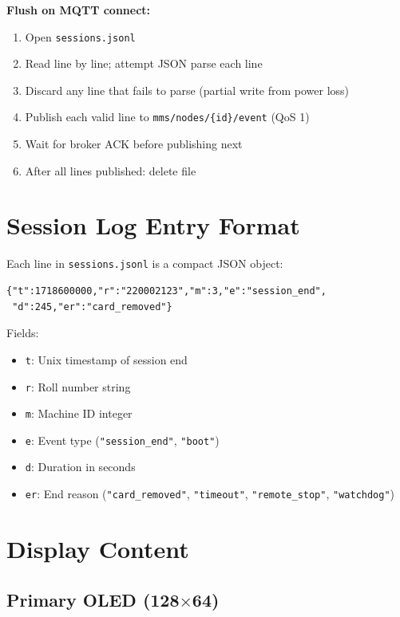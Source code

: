 \textbf{Flush on MQTT connect:}
\begin{enumerate}[leftmargin=1.5em]
    \item Open \texttt{sessions.jsonl}
    \item Read line by line; attempt JSON parse each line
    \item Discard any line that fails to parse (partial write from power loss)
    \item Publish each valid line to \texttt{mms/nodes/\{id\}/event} (QoS 1)
    \item Wait for broker ACK before publishing next
    \item After all lines published: delete file
\end{enumerate}

\section{Session Log Entry Format}

Each line in \texttt{sessions.jsonl} is a compact JSON object:

\begin{lstlisting}[style=jsonlstyle,caption={Session log entry format}]
{"t":1718600000,"r":"220002123","m":3,"e":"session_end",
 "d":245,"er":"card_removed"}
\end{lstlisting}

Fields:
\begin{itemize}[leftmargin=1.5em,noitemsep]
    \item \texttt{t}: Unix timestamp of session end
    \item \texttt{r}: Roll number string
    \item \texttt{m}: Machine ID integer
    \item \texttt{e}: Event type (\texttt{"session\_end"}, \texttt{"boot"})
    \item \texttt{d}: Duration in seconds
    \item \texttt{er}: End reason (\texttt{"card\_removed"}, \texttt{"timeout"}, \texttt{"remote\_stop"}, \texttt{"watchdog"})
\end{itemize}

\section{Display Content}

\subsection{Primary OLED (128$\times$64)}

